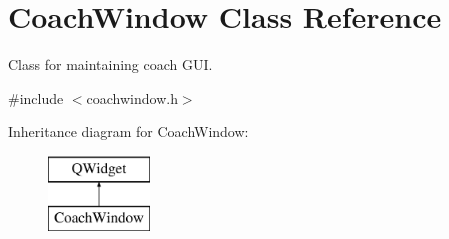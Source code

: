 \hypertarget{classCoachWindow}{}\section{Coach\+Window Class Reference}
\label{classCoachWindow}


Class for maintaining coach G\+UI.  




{\ttfamily \#include $<$coachwindow.\+h$>$}

Inheritance diagram for Coach\+Window\+:\begin{figure}[H]
\begin{center}
\leavevmode
\includegraphics[height=2.000000cm]{classCoachWindow}
\end{center}
\end{figure}
